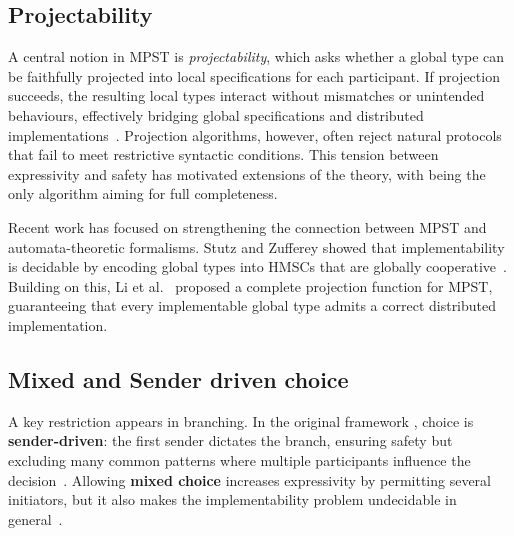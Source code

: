 
\subsection{Projectability}
A central notion in MPST is \emph{projectability}, which asks whether 
a global type can be faithfully projected into local specifications for 
each participant. If projection succeeds, the resulting local types 
interact without mismatches or unintended behaviours, effectively 
bridging global specifications and distributed implementations~\cite{honda2008multiparty}.  
Projection algorithms, however, often reject natural protocols that 
fail to meet restrictive syntactic conditions. This tension between 
expressivity and safety has motivated extensions of the theory, with 
\cite{castagna2012global} being the only algorithm aiming for full 
completeness.

Recent work has focused on strengthening the connection between MPST 
and automata-theoretic formalisms. Stutz and Zufferey 
showed that implementability is decidable by encoding global types 
into HMSCs that are globally cooperative~\cite{stutz2022comparing,stutz2023asynchronous}. 
Building on this, Li et al.~\cite{li2023complete} proposed a complete 
projection function for MPST, guaranteeing that every implementable 
global type admits a correct distributed implementation.

\subsection{Mixed and Sender driven choice}
A key restriction appears in branching. In the original framework \cite{honda2008multiparty,carbone2012structured}, 
choice is \textbf{sender-driven}: the first sender dictates the branch, 
ensuring safety but excluding many common patterns where multiple 
participants influence the decision~\cite{carbone2012structured}.  
Allowing \textbf{mixed choice} increases expressivity by permitting 
several initiators, but it also makes the implementability problem 
undecidable in general~\cite{barbanera2020choreography}.  

